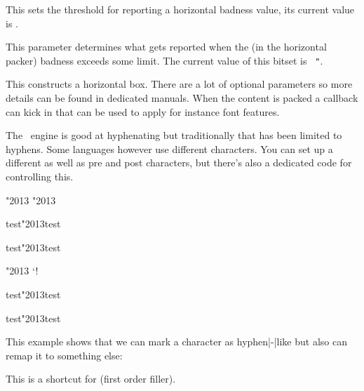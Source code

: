 \stopoldprimitive

\startoldprimitive[title={\prm {hbadness}}]

This sets the threshold for reporting a horizontal badness value, its current
value is \the \badness.

\stopoldprimitive

\startnewprimitive[title={\prm {hbadnessmode}}]

This parameter determines what gets reported when the (in the horizontal packer)
badness exceeds some limit. The current value of this bitset is {\tt
"\tohexadecimal \hbadnessmode}.

\startfourrows
{}
\stopfourrows

\stopnewprimitive

\startoldprimitive[title={\prm {hbox}}]

This constructs a horizontal box. There are a lot of optional parameters so more
details can be found in dedicated manuals. When the content is packed a callback
can kick in that can be used to apply for instance font features.

\stopoldprimitive

\startnewprimitive[title={\prm {hccode}}]

The \TEX\ engine is good at hyphenating but traditionally that has been limited
to hyphens. Some languages however use different characters. You can set up a
different  as well as pre and post characters, but there's also
a dedicated code for controlling this.

\startbuffer
\hccode"2013 "2013

\hsize 50mm test\char"2013test\par
\hsize  1mm test\char"2013test\par

\hccode"2013 `!

\hsize 50mm test\char"2013test\par
\hsize  1mm test\char"2013test\par
\stopbuffer

\typebuffer

This example shows that we can mark a character as hyphen|-|like but also can
remap it to something else:

\startpacked \getbuffer \stoppacked

\stopnewprimitive

\startoldprimitive[title={\prm {hfil}}]

This is a shortcut for  (first order filler).

